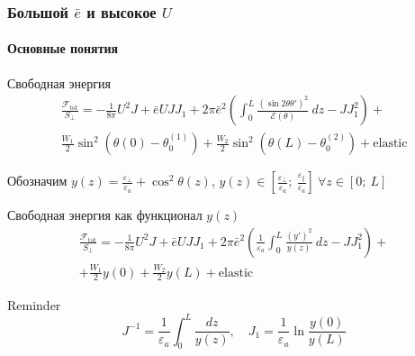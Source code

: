 \documentclass[utf8,secheader]{beamer}
\newcommand\blfootnote[1]{%
  \begingroup
  \renewcommand\thefootnote{}\footnote{#1}%
  \addtocounter{footnote}{-1}%
  \endgroup
}
\newcommand{\FF}{\mathcal{F}}
\newcommand{\EE}{\mathcal{E}}
\begin{document}

\begin{frame}
\frametitle{Большой $\bar{e}$ и высокое $U$}
\framesubtitle{Основные понятия}
\footnotesize
\begin{block}{Свободная энергия}
\vspace{-0.5cm}
\begin{multline}
\frac{\FF_\mathrm{tot}}{S_\bot} = -\frac{1}{8\pi}U^2 J + \bar{e}UJJ_1 + 2\pi\bar{e}^2 \left( \int_0^L\frac{(\sin 2{\theta} \theta')^2}{\EE(\theta)}\ dz - JJ_1^2 \right) +\\
\frac{W_1}{2}\sin^2\left(\theta(0) - \theta_0^{(1)}\right) + \frac{W_2}{2}\sin^2\left(\theta(L) - \theta_0^{(2)}\right) + \mathrm{elastic}
\end{multline}
\end{block}
Обозначим $y(z) = \frac{\varepsilon_\bot}{\varepsilon_a} + \cos^2{\theta(z)}$, $y(z) \in \left[ \frac{\varepsilon_\bot}{\varepsilon_a};\ \frac{\varepsilon_\parallel}{\varepsilon_a} \right]\ \forall z \in [0;\ L]$
\begin{block}{Свободная энергия как функционал $y(z)$}
\vspace{-0.5cm}
\begin{multline}
\frac{\FF_\mathrm{tot}}{S_\bot} = -\frac{1}{8\pi}U^2 J + \bar{e}UJJ_1 + 2\pi\bar{e}^2 \left( \frac{1}{\varepsilon_a}\int_0^L\frac{(y')^2}{y(z)}\ dz - JJ_1^2 \right) +\\
 + \frac{W_1}{2}y(0) + \frac{W_2}{2}y(L) + \mathrm{elastic}
\end{multline}
\end{block}
\begin{block}{Reminder}
\begin{equation}
J^{-1} =\frac{1}{\varepsilon_a}\int_0^L \frac{dz}{y(z)}, \quad J_1 = \frac{1}{\varepsilon_a} \ln \frac{y(0)}{y(L)}
\end{equation}
\end{block}
\end{frame}
\end{document}
